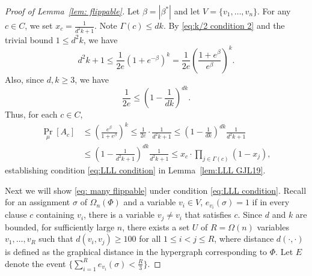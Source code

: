 \documentclass[11pt]{article}
\theoremstyle{definition}
\theoremstyle{remark}
\begin{document}
\begin{proof}[Proof of Lemma~\ref{lem: flippable}]
Let $\beta = |\beta^*|$ and let $V=\{v_1,\dots, v_n\}$.
    For any $c\in C$, we set $x_c = \frac{1}{d^2k+1}$. Note $\Gamma(c)\le dk$.
    By 
\eqref{eq:k/2 condition 2}
and the trivial bound 
$1\le d^2 k$,  
we have
    \[d^2 k+1 \le  
    \frac{1}{2e} (1+e^{-\beta})^k =
    \frac{1}{2e} \left( \frac{1+e^{\beta}}{e^{\beta}} \right)^k. \]
    Also, since $d,k\ge 3$, we have 
    \[
    \frac{1}{2e} \le  \left(1-\frac{1}{dk} \right)^{dk}.
    \]
    Thus, for each $c\in C$,
    \begin{align*}
        \Pr_\mu[A_c] &\le \left( \frac{e^\beta}{1+e^\beta} \right)^k 
        \le \frac{1}{2e} \cdot \frac{1}{d^2k+1} 
        \le  \left(1-\frac{1}{dk} \right)^{dk} \frac{1}{d^2k+1} \\
        &\le  \left(1-\frac{1}{d^2k+1} \right)^{dk} \frac{1}{d^2k+1}
        \le x_c \cdot \prod_{j\in \Gamma(c)} (1 - x_j),
    \end{align*}
    establishing condition \eqref{eq:LLL condition} in Lemma~\ref{lem:LLL GJL19}.
    
    Next we will show \eqref{eq: many flippable}   under condition \eqref{eq:LLL condition}. 
    Recall for an assignment $\sigma$ of $\Omega_n(\Phi)$ and a variable $v_i\in V$, $e_{v_i}(\sigma)=1$ if in every clause $c$ containing $v_i$, there is a variable $v_j\neq v_i$ that satisfies $c$. 
    Since $d$ and $k$ are bounded, for sufficiently large $n$, 
    there exists a set $U$ of $R=\Omega(n)$ variables $v_1, \dots, v_R$ such that
    $d(v_i, v_j) \ge 100$ for all $1\le i<j \le R$, where distance $d(\cdot, \cdot)$ is defined as the graphical distance in the hypergraph corresponding to $\Phi$.
    Let $E$ denote the event $\{\sum_{i=1}^R e_{v_i}(\sigma) < \frac{R}{3}\}$.


\end{proof}
\end{document}
